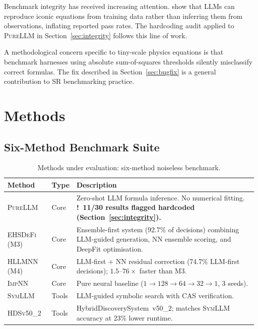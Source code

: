 \documentclass[twoside,11pt]{article}
\newcommand{\PureLLM}{\textsc{PureLLM}}
\newcommand{\INN}{\textsc{ImpNN}}
\newcommand{\EHD}{\textsc{EHSDeFi}}
\newcommand{\HSL}{\textsc{HLLMNN}}
\newcommand{\SEL}{\textsc{SymLLM}}
\newcommand{\HDS}{\textsc{HDSv50\_2}}
\newcommand{\warn}{{\color{warnAmber}\textbf{!}}}
\begin{document}
Benchmark integrity has received increasing attention.
\citet{memorization2024audit} show that LLMs can reproduce iconic equations
from training data rather than inferring them from observations, inflating
reported pass rates.  The hardcoding audit applied to \PureLLM{} in
Section~\ref{sec:integrity} follows this line of work.

A methodological concern specific to tiny-scale physics equations is that
benchmark harnesses using absolute sum-of-squares thresholds silently
misclassify correct formulas.  The fix described in Section~\ref{sec:bugfix}
is a general contribution to SR benchmarking practice.

\section{Methods}
\label{sec:methods}

\subsection{Six-Method Benchmark Suite}
\label{sec:methods:sixmethod}

\begin{table}[ht]
\caption{Methods under evaluation: six-method noiseless benchmark.}
\label{tab:methods}
\centering
\small
\renewcommand{\arraystretch}{1.3}
\begin{tabular}{L{2.1cm} L{1.3cm} L{8.0cm}}
\toprule
\textbf{Method} & \textbf{Type} & \textbf{Description} \\
\midrule
{}
\PureLLM & Core &
  Zero-shot LLM formula inference.  No numerical fitting.
  \textbf{\warn~11/30 results flagged hardcoded (Section~\ref{sec:integrity}).} \\
\EHD\,(M3) & Core &
  Ensemble-first system (92.7\% of decisions) combining LLM-guided generation,
  NN ensemble scoring, and DeepFit optimisation. \\
\HSL\,(M4) & Core &
  LLM-first + NN residual correction (74.7\% LLM-first decisions);
  $1.5$--$76\times$ faster than M3. \\
\INN & Core &
  Pure neural baseline ($1\!\to\!128\!\to\!64\!\to\!32\!\to\!1$, 3 seeds). \\
\SEL & Tools &
  LLM-guided symbolic search with CAS verification. \\
\HDS & Tools &
  HybridDiscoverySystem~v50\_2; matches \SEL{} accuracy at 23\% lower runtime. \\
\bottomrule
\end{tabular}
\end{table}
\end{document}
